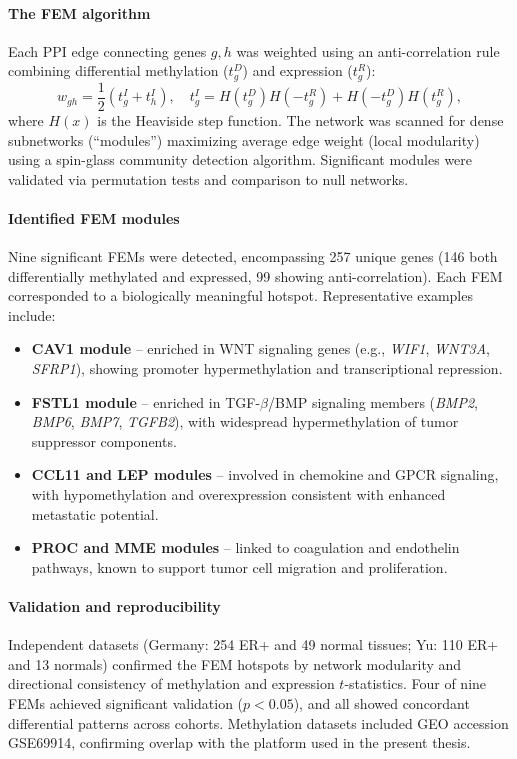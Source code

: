 \documentclass[10pt]{extarticle}
\begin{document}
\paragraph{The FEM algorithm}
Each PPI edge connecting genes \( g, h \) was weighted using an anti-correlation rule combining differential methylation (\( t^D_g \)) and expression (\( t^R_g \)):
\[
w_{gh} = \frac{1}{2} \left( t^I_g + t^I_h \right), \quad 
t^I_g = H(t^D_g)H(-t^R_g) + H(-t^D_g)H(t^R_g),
\]
where \(H(x)\) is the Heaviside step function.
The network was scanned for dense subnetworks (“modules”) maximizing average edge weight (local modularity) using a spin-glass community detection algorithm. Significant modules were validated via permutation tests and comparison to null networks.

\paragraph{Identified FEM modules}
Nine significant FEMs were detected, encompassing 257 unique genes (146 both differentially methylated and expressed, 99 showing anti-correlation). Each FEM corresponded to a biologically meaningful hotspot. Representative examples include:
\begin{itemize}[label=-]
\item \textbf{CAV1 module} – enriched in WNT signaling genes (e.g., \textit{WIF1}, \textit{WNT3A}, \textit{SFRP1}), showing promoter hypermethylation and transcriptional repression.
\item \textbf{FSTL1 module} – enriched in TGF-$\beta$/BMP signaling members (\textit{BMP2}, \textit{BMP6}, \textit{BMP7}, \textit{TGFB2}), with widespread hypermethylation of tumor suppressor components.
\item \textbf{CCL11 and LEP modules} – involved in chemokine and GPCR signaling, with hypomethylation and overexpression consistent with enhanced metastatic potential.
\item \textbf{PROC and MME modules} – linked to coagulation and endothelin pathways, known to support tumor cell migration and proliferation.
\end{itemize}

\paragraph{Validation and reproducibility}
Independent datasets (Germany: 254 ER+ and 49 normal tissues; Yu: 110 ER+ and 13 normals) confirmed the FEM hotspots by network modularity and directional consistency of methylation and expression \(t\)-statistics. Four of nine FEMs achieved significant validation (\(p<0.05\)), and all showed concordant differential patterns across cohorts. Methylation datasets included GEO accession GSE69914, confirming overlap with the platform used in the present thesis.
\end{document}
